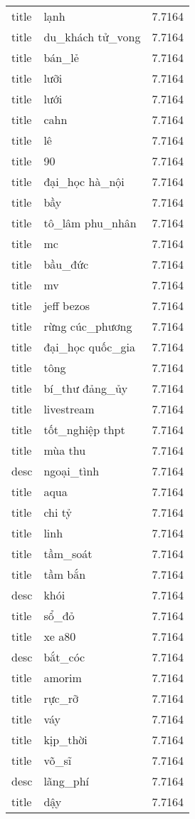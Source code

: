 \documentclass{article}
\begin{document}
\begin{tabular}{lll}
title & lạnh & 7.7164\\
title & du\_khách tử\_vong & 7.7164\\
title & bán\_lẻ & 7.7164\\
title & lưỡi & 7.7164\\
title & lưới & 7.7164\\
title & cahn & 7.7164\\
title & lê & 7.7164\\
title & 90 & 7.7164\\
title & đại\_học hà\_nội & 7.7164\\
title & bầy & 7.7164\\
title & tô\_lâm phu\_nhân & 7.7164\\
title & mc & 7.7164\\
title & bầu\_đức & 7.7164\\
title & mv & 7.7164\\
title & jeff bezos & 7.7164\\
title & rừng cúc\_phương & 7.7164\\
title & đại\_học quốc\_gia & 7.7164\\
title & tông & 7.7164\\
title & bí\_thư đảng\_ủy & 7.7164\\
title & livestream & 7.7164\\
title & tốt\_nghiệp thpt & 7.7164\\
title & mùa thu & 7.7164\\
desc & ngoại\_tình & 7.7164\\
title & aqua & 7.7164\\
title & chi tỷ & 7.7164\\
title & linh & 7.7164\\
title & tầm\_soát & 7.7164\\
title & tầm bắn & 7.7164\\
desc & khói & 7.7164\\
title & sổ\_đỏ & 7.7164\\
title & xe a80 & 7.7164\\
desc & bắt\_cóc & 7.7164\\
title & amorim & 7.7164\\
title & rực\_rỡ & 7.7164\\
title & váy & 7.7164\\
title & kịp\_thời & 7.7164\\
title & võ\_sĩ & 7.7164\\
desc & lãng\_phí & 7.7164\\
title & dậy & 7.7164\\

\end{tabular}
\end{document}

